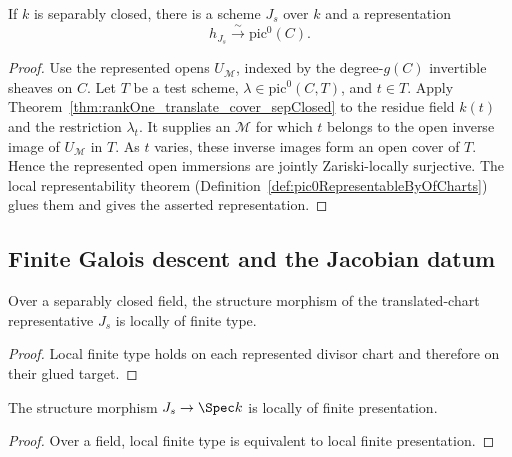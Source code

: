 \begin{definition}
  \label{def:pic0_sepClosed_representableBy}
  \leanok
  If \(k\) is separably closed, there is a scheme \(J_s\) over \(k\) and a representation
  \[
    h_{J_s}\xrightarrow{\ \sim\ }\mathrm{pic}^0(C).
  \]
\end{definition}
\begin{proof}
  \leanok
  Use the represented opens \(U_{\mathcal M}\), indexed by the degree-\(g(C)\) invertible
  sheaves on \(C\).  Let \(T\) be a test scheme, \(\lambda\in\mathrm{pic}^0(C,T)\), and
  \(t\in T\).  Apply Theorem~\ref{thm:rankOne_translate_cover_sepClosed} to the residue field
  \(k(t)\) and the restriction \(\lambda_t\).  It supplies an \(\mathcal M\) for which \(t\)
  belongs to the open inverse image of \(U_{\mathcal M}\) in \(T\).  As \(t\) varies, these
  inverse images form an open cover of \(T\).  Hence the represented open immersions are
  jointly Zariski-locally surjective.  The local representability theorem
  (Definition~\ref{def:pic0RepresentableByOfCharts}) glues them and gives the asserted
  representation.
\end{proof}

\subsection{Finite Galois descent and the Jacobian datum}

\begin{theorem}
  \label{thm:pic0SepClosed_lft}
  \leanok
  Over a separably closed field, the structure morphism of the translated-chart
  representative \(J_s\) is locally of finite type.
\end{theorem}
\begin{proof}
  \leanok
  Local finite type holds on each represented divisor chart and therefore on their glued
  target.
\end{proof}

\begin{theorem}
  \label{thm:pic0SepClosed_lfp}
  \leanok
  The structure morphism \(J_s\to\Spec k\) is locally of finite presentation.
\end{theorem}
\begin{proof}
  \leanok
  Over a field, local finite type is equivalent to local finite presentation.
\end{proof}

